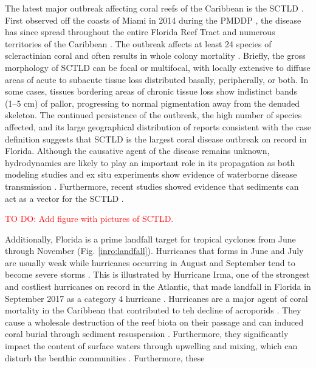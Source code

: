 \documentclass[12pt ,a4paper]{article}
\newcommand{\todo}[1]{\textcolor{red}{TO DO: #1}}
\begin{document}
The latest major outbreak affecting coral reefs of the Caribbean is the SCTLD \citep{noaa2018}. First observed off the coasts of Miami in 2014 during the PMDDP \citep{precht2016unprecedented}, the disease has since spread throughout the entire Florida Reef Tract and numerous territories of the Caribbean \citep{alvarez2019rapid, kramer2019map, estrada2021effects}. The outbreak affects at least 24 species of scleractinian coral and often results in whole colony mortality \citep{precht2016unprecedented, walton2018impacts}. Briefly, the gross morphology of SCTLD can be focal or multifocal, with locally extensive to diffuse areas of acute to subacute tissue loss distributed basally, peripherally, or both. In some cases, tissues bordering areas of chronic tissue loss show indistinct bands (1–5 cm) of pallor, progressing to normal pigmentation away from the denuded skeleton. The continued persistence of the outbreak, the high number of species affected, and its large geographical distribution of reports consistent with the case definition suggests that SCTLD is the largest coral disease outbreak on record in Florida. Although the causative agent of the disease remains unknown, hydrodynamics are likely to play an important role in its propagation as both modeling studies and ex situ experiments show evidence of waterborne disease transmission \citep{aeby2019pathogenesis,dobbelaere2020coupled,eaton2021measuring,meiling2021variable}. Furthermore, recent studies showed evidence that sediments can act as a vector for the SCTLD \citep{rosales2020rhodobacterales, studivan2022reef}. 

\todo{Add figure with pictures of SCTLD.}

Additionally, Florida is a prime landfall target for tropical cyclones from June through November (Fig. \ref{inro:landfall}). Hurricanes that forms in June and July are usually weak while hurricanes occurring in August and September tend to become severe storms \citep{banks2008reef}. This is illustrated by Hurricane Irma, one of the strongest and costliest hurricanes on record in the Atlantic, that made landfall in Florida in September 2017 as a category 4 hurricane \citep{irmaNOAA, xian2018brief}. Hurricanes are a major agent of coral mortality in the Caribbean that contributed to teh decline of acroporids \citep{gardner2003long,aronson2001white}. They cause a wholesale destruction of the reef biota on their passage and can induced coral burial through sediment resuspension \citep{banks2008reef, miller2008effects}. Furthermore, they significantly impact the content of surface waters through upwelling and mixing, which can disturb the benthic communities \citep{wachnicka2019hurricane,varlas2020investigating}. Furthermore, these 
\end{document}
